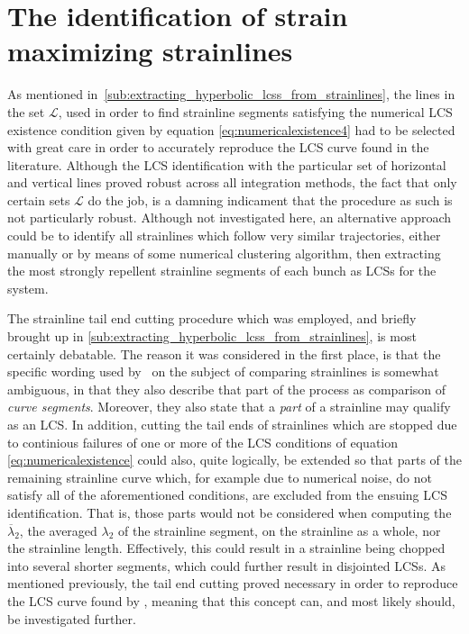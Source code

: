 \section{The identification of strain maximizing strainlines}
\label{sec:the_identification_of_strain_maximizing_strainlines}

As mentioned in~\cref{sub:extracting_hyperbolic_lcss_from_strainlines},
the lines in the set $\mathcal{L}$, used in order to find strainline segments
satisfying the numerical LCS existence condition given by equation
\eqref{eq:numericalexistence4} had to be selected with great care in order
to accurately reproduce the LCS curve found in the literature. Although
the LCS identification with the particular set of horizontal and vertical lines
proved robust across all integration methods, the fact that only certain sets
$\mathcal{L}$ do the job, is a damning indicament that the procedure as such
is not particularly robust. Although not investigated here, an alternative
approach could be to identify all strainlines which follow very similar
trajectories, either manually or by means of some numerical clustering
algorithm, then extracting the most strongly repellent strainline segments
of each bunch as LCSs for the system.

The strainline tail end cutting procedure which was employed, and
briefly brought up in
\cref{sub:extracting_hyperbolic_lcss_from_strainlines}, is most certainly
debatable. The reason it was considered in the first place, is that the specific
wording used by~\textcite{farazmand2012computing} on the subject of comparing
strainlines is somewhat ambiguous, in that they also describe that part of
the process as comparison of \emph{curve segments}. Moreover, they also state
that a \emph{part} of a strainline may qualify as an LCS. In addition,
cutting the tail ends of strainlines which are stopped due to continious
failures of one or more of the LCS conditions of equation
\eqref{eq:numericalexistence} could also, quite logically, be extended so that
parts of the remaining strainline curve which, for example due to numerical
noise, do not satisfy all of the aforementioned conditions, are excluded from
the ensuing LCS identification. That is, those parts would not be considered
when computing the $\overline{\lambda}_{2}$, the averaged $\lambda_{2}$ of
the strainline segment, on the strainline as a whole, nor
the strainline length. Effectively, this could result in a strainline being
chopped into several shorter segments, which could further result in
disjointed LCSs. As mentioned previously, the tail end cutting proved necessary
in order to reproduce the LCS curve found by \textcite{farazmand2012computing},
meaning that this concept can, and most likely should, be investigated further.

